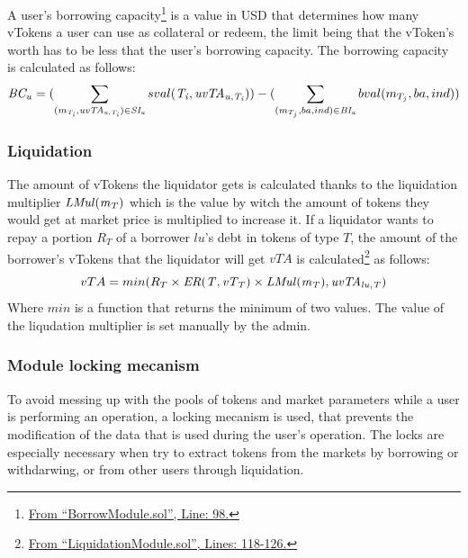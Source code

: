 A user's borrowing capacity\footnote{\href{https://github.com/SVOIcom/everscalend-contracts/blob/8d24e268f9c44bd3e896fb6a28bbf8a42c7027a9/smart-contracts/src/ModulesForMarket/BorrowModule.sol\#L98}{From ``BorrowModule.sol'', Line: 98.}} is a value in USD that determines how many vTokens a user can use as collateral or redeem, the limit being that the vToken's worth has to be less that the user's borrowing capacity. The borrowing capacity is calculated as follows:
$$
  \mathit{BC_{u}} = (\sum_{(m_{\mathit{T_{i}}}, \mathit{uvTA_{u, \mathit{T_{i}}}}) \in \mathit{SI_{u}}} sval(\mathit{T_{i}}, \mathit{uvTA_{u, \mathit{T_{i}}}})) - (\sum_{(m_{T_j}, ba, ind) \in \mathit{BI_{u}}} bval(m_{T_j}, ba, ind))
$$

\subsubsection{Liquidation}

The amount of vTokens the liquidator gets is calculated thanks to the liquidation multiplier $\mathit{LMul(\mathit{m_{T}})}$ which is the value by witch the amount of tokens they would get at market price is multiplied to increase it. If a liquidator wants to repay a portion $R_T$ of a borrower $lu$'s debt in tokens of type $T$, the amount of the borrower's vTokens that the liquidator will get $vTA$ is calculated\footnote{\href{https://github.dev/SVOIcom/everscalend-contracts/blob/8d24e268f9c44bd3e896fb6a28bbf8a42c7027a9/smart-contracts/src/ModulesForMarket/LiquidationModule.sol\#L118-L126}{From ``LiquidationModule.sol'', Lines: 118-126.}} as follows:
$$
  vTA = min(R_T \times \mathit{ER(T, \mathit{vT_{T}})} \times \mathit{LMul(\mathit{m_{T}})}, \mathit{uvTA_{lu, T}})
$$
Where $min$ is a function that returns the minimum of two values. The value of the liqudation multiplier is set manually by the admin.

\subsubsection{Module locking mecanism}

To avoid messing up with the pools of tokens and market parameters while a user is performing an operation, a locking mecanism is used, that prevents the modification of the data that is used during the user's operation. The locks are especially necessary when try to extract tokens from the markets by borrowing or withdarwing, or from other users through liquidation.

